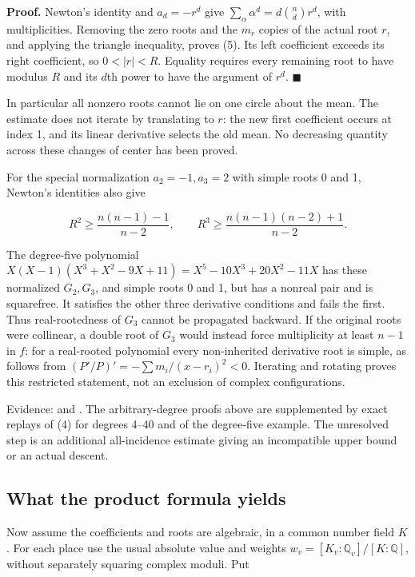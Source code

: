 \documentclass[
  british,
  10pt,
]{article}
\begin{document}
\textbf{Proof.} Newton's identity and \(a_d=-r^d\) give
\(\sum_\alpha\alpha^d=d\binom nd r^d\), with multiplicities. Removing
the zero roots and the \(m_r\) copies of the actual root \(r\), and
applying the triangle inequality, proves (5). Its left coefficient
exceeds its right coefficient, so \(0<|r|<R\). Equality requires every
remaining root to have modulus \(R\) and its \(d\)th power to have the
argument of \(r^d\). \(\blacksquare\)

In particular all nonzero roots cannot lie on one circle about the mean.
The estimate does not iterate by translating to \(r\): the new first
coefficient occurs at index 1, and its linear derivative selects the old
mean. No decreasing quantity across these changes of center has been
proved.

For the special normalization \(a_2=-1,a_3=2\) with simple roots 0 and
1, Newton's identities also give

\[
 R^2\ge\frac{n(n-1)-1}{n-2},\qquad
 R^3\ge\frac{n(n-1)(n-2)+1}{n-2}.                      \tag{6}
\]

The degree-five polynomial \(X(X-1)(X^3+X^2-9X+11)=X^5-10X^3+20X^2-11X\)
has these normalized \(G_2,G_3\), and simple roots 0 and 1, but has a
nonreal pair and is squarefree. It satisfies the other three derivative
conditions and fails the first. Thus real-rootedness of \(G_3\) cannot
be propagated backward. If the original roots were collinear, a double
root of \(G_3\) would instead force multiplicity at least \(n-1\) in
\(f\): for a real-rooted polynomial every non-inherited derivative root
is simple, as follows from \((P'/P)'=-\sum m_i/(x-r_i)^2<0\). Iterating
and rotating proves this restricted statement, not an exclusion of
complex configurations.

Evidence: 
and . The arbitrary-degree proofs
above are supplemented by exact replays of (4) for degrees 4--40 and of
the degree-five example. The unresolved step is an additional
all-incidence estimate giving an incompatible upper bound or an actual
descent.

\subsection{What the product formula
yields}\label{what-the-product-formula-yields}

Now assume the coefficients and roots are algebraic, in a common number
field \(K\). For each place use the usual absolute value and weights
\(w_v=[K_v:\mathbb Q_v]/[K:\mathbb Q]\), without separately squaring
complex moduli. Put
\end{document}
